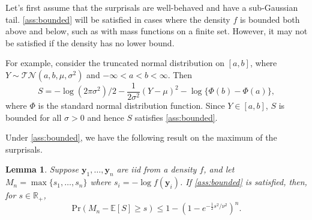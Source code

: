 \documentclass[a4paper,11pt]{article}
\newcommand{\E}{\mathbb{E}}
\newtheorem{lemma}{Lemma}
\begin{document}
Let's first assume that the surprisals are well-behaved and have a sub-Gaussian tail. \cref{ass:bounded} will be satisfied in cases where the density $f$ is bounded both above and below, such as with mass functions on a finite set. However, it may not be satisfied if the density has no lower bound.

For example, consider the truncated normal distribution on $[a,b]$, where $Y\sim \mathcal{TN}(a,b,\mu,\sigma^2)$ and $-\infty < a < b < \infty$. Then
$$
	S=-\log(2\pi\sigma^2)/2-\frac{1}{2\sigma^2}(Y-\mu)^2-\log\{\Phi(b)-\Phi(a)\},
$$
where $\Phi$ is the standard normal distribution function. Since $Y\in[a,b]$, $S$ is bounded for all $\sigma>0$ and hence $S$ satisfies \cref{ass:bounded}.

Under \cref{ass:bounded}, we have the following result on the maximum of the surprisals.
\begin{lemma}\label{lem:bounds}
	Suppose $\bm{y}_1,\dots,\bm{y}_n$ are iid from a density $f$, and let $M_n = \max\{s_1,\dots,s_n\}$ where $s_i = -\log f(\bm{y}_i)$. If \cref{ass:bounded} is satisfied, then, for $s\in\mathbb{R}_+$,
	$$
		\mathrm{Pr}(M_n-\E[S]\ge s)\le 1-\left(1-e^{-\frac{1}{2}s^2/\nu^2}\right)^n.
	$$
\end{lemma}
\end{document}
